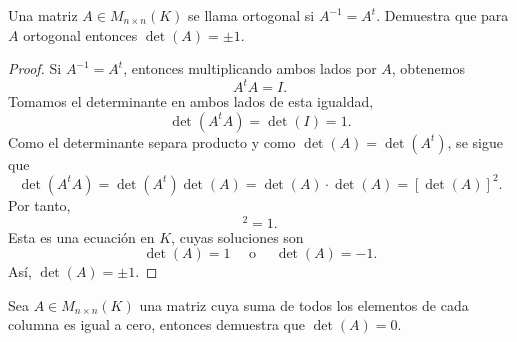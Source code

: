 \documentclass[12pt,a4paper]{article}
\begin{document}
    \begin{problema}
        Una matriz $A\in M_{n\times n}(K)$ se llama ortogonal si $A^{-1}=A^{t}$. Demuestra que para $A$ ortogonal entonces $\det(A)=\pm1$.
    \end{problema}

    \begin{proof}
        Si $A^{-1}=A^{t}$, entonces multiplicando ambos lados por $A$, obtenemos
        \begin{equation*}
            A^{t}A=I.
        \end{equation*}
        Tomamos el determinante en ambos lados de esta igualdad,
        \begin{equation*}
            \det(A^{t}A)=\det(I)=1.
        \end{equation*}
        Como el determinante separa producto y como $\det(A)=\det(A^{t})$, se sigue que
        \begin{equation*}
            \det(A^{t}A)=\det(A^{t})\det(A)=\det(A)\cdot\det(A)=[\det(A)]^{2}.
        \end{equation*}
        Por tanto,
        \begin{equation*}
            [\det(A)]^{2}=1.
        \end{equation*}
        Esta es una ecuación en $K$, cuyas soluciones son
        \begin{equation*}
            \det(A)=1\quad\text{ o }\quad\det(A)=-1.
        \end{equation*}
        Así, $\det(A)=\pm1$.
    \end{proof}

    \begin{problema}
        Sea $A\in M_{n\times n}(K)$ una matriz cuya suma de todos los elementos de cada columna es igual a cero, entonces demuestra que $\det(A)=0$.
    \end{problema}
\end{document}
